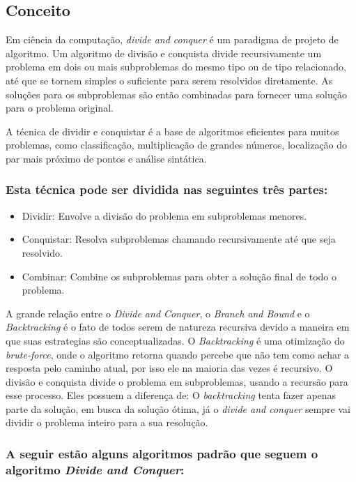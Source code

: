 \subsection{Conceito}

Em ciência da computação, \emph{divide and conquer} é um paradigma de projeto de algoritmo. 
Um algoritmo de divisão e conquista divide recursivamente um problema em dois ou mais
subproblemas do mesmo tipo ou de tipo relacionado, até que se tornem simples o suficiente para serem resolvidos diretamente. 
As soluções para os subproblemas são então combinadas para fornecer uma solução para o 
problema original.

A técnica de dividir e conquistar é a base de algoritmos eficientes para muitos problemas, 
como classificação, multiplicação de grandes números, localização do par mais próximo de pontos e análise sintática.

\subsubsection*{Esta técnica pode ser dividida nas seguintes três partes:}

\begin{itemize}
    \item Dividir: Envolve a divisão do problema em subproblemas menores.
    \item Conquistar: Resolva subproblemas chamando recursivamente até que seja resolvido.
    \item Combinar: Combine os subproblemas para obter a solução final de todo o problema.
\end{itemize}

A grande relação entre o \emph{Divide and Conquer}, o \emph{Branch and Bound} e o \emph{Backtracking} é o fato de todos serem de 
natureza recursiva devido a maneira em que suas estrategias são conceptualizadas. 
O \emph{Backtracking} é uma otimização do \emph{brute-force}, onde o algoritmo retorna quando percebe que não tem como 
achar a resposta pelo caminho atual, por isso ele na maioria das vezes é recursivo. 
O divisão e conquista divide o problema em subproblemas, usando a recursão para esse processo. 
Eles possuem a diferença de: O \emph{backtracking} tenta fazer apenas parte da solução, em busca da solução ótima, 
já o \emph{divide and conquer} sempre vai dividir o problema inteiro para a sua resolução.

\subsubsection*{A seguir estão alguns algoritmos padrão que seguem o algoritmo \emph{Divide and Conquer}:}

